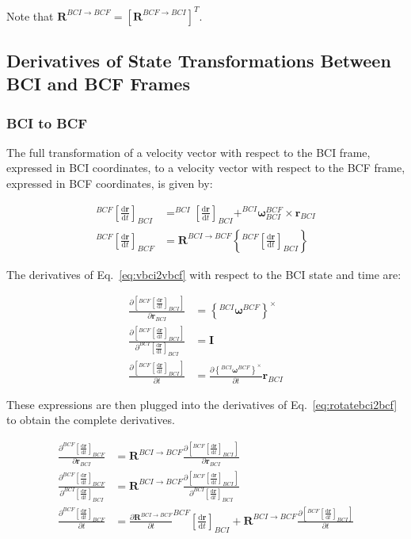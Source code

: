 \documentclass[]{article}
\newcommand{\vb}[1]{\bm{#1}} %
\newcommand{\ddt}[1]{\frac{\mathrm{d} #1}{\mathrm{d} t}} %
\newcommand{\pd}[2]{\frac{\partial #1}{\partial #2}} %
\begin{document}
Note that $\vb{R}^{BCI \rightarrow BCF} = \left[ \vb{R}^{BCF \rightarrow BCI} \right]^T$.

\subsection{Derivatives of State Transformations Between BCI and BCF Frames}
\label{sec:state_transformation_derivs}

\subsubsection{BCI to BCF}

The full transformation of a velocity vector with respect to the BCI frame, expressed in BCI coordinates, to a velocity vector with respect to the BCF frame, expressed in BCF coordinates, is given by:

\begin{align}
\label{eq:vbci2vbcf}
^{BCF} \left[ \ddt{\vb{r}} \right]_{BCI} &= ^{BCI} \left[ \ddt{\vb{r}} \right]_{BCI} + ^{BCI} \vb{\omega}_{BCI}^{BCF} \times \vb{r}_{BCI} \\
\label{eq:rotatebci2bcf}
^{BCF} \left[ \ddt{\vb{r}} \right]_{BCF} &= \vb{R}^{BCI \rightarrow BCF} \left\{^{BCF} \left[ \ddt{\vb{r}} \right]_{BCI} \right\}
\end{align}

The derivatives of Eq.~\eqref{eq:vbci2vbcf} with respect to the BCI state and time are:

\begin{align}
\pd{\left[ ^{BCF} \left[ \ddt{\vb{r}} \right]_{BCI} \right]}{\vb{r}_{BCI}} &= \left\{ ^{BCI} \vb{\omega}^{BCF} \right\}^{\times} \\
\pd{\left[ ^{BCF} \left[ \ddt{\vb{r}} \right]_{BCI} \right]}{^{BCI} \left[ \ddt{\vb{r}} \right]_{BCI}} &= \vb{I} \\
\pd{\left[ ^{BCF} \left[ \ddt{\vb{r}} \right]_{BCI} \right]}{t} &= { \pd{\left\{ ^{BCI} \vb{\omega}^{BCF} \right\}^{\times}}{t}} \vb{r}_{BCI}
\end{align}

These expressions are then plugged into the derivatives of Eq.~\eqref{eq:rotatebci2bcf} to obtain the complete derivatives.

\begin{align}
\pd{^{BCF} \left[ \ddt{\vb{r}} \right]_{BCF}}{\vb{r}_{BCI}} &= \vb{R}^{BCI \rightarrow BCF} \pd{\left[ ^{BCF} \left[ \ddt{\vb{r}} \right]_{BCI} \right]}{\vb{r}_{BCI}} \\
\pd{^{BCF} \left[ \ddt{\vb{r}} \right]_{BCF}}{^{BCI} \left[ \ddt{\vb{r}} \right]_{BCI}} &= \vb{R}^{BCI \rightarrow BCF} \pd{\left[ ^{BCF} \left[ \ddt{\vb{r}} \right]_{BCI} \right]}{^{BCI} \left[ \ddt{\vb{r}} \right]_{BCI}} \\
\pd{^{BCF} \left[ \ddt{\vb{r}} \right]_{BCF}}{t} &= \pd{\vb{R}^{BCI \rightarrow BCF}}{t} ^{BCF} \left[ \ddt{\vb{r}} \right]_{BCI} + \vb{R}^{BCI \rightarrow BCF} \pd{\left[ ^{BCF} \left[ \ddt{\vb{r}} \right]_{BCI} \right]}{t}
\end{align}
\end{document}
